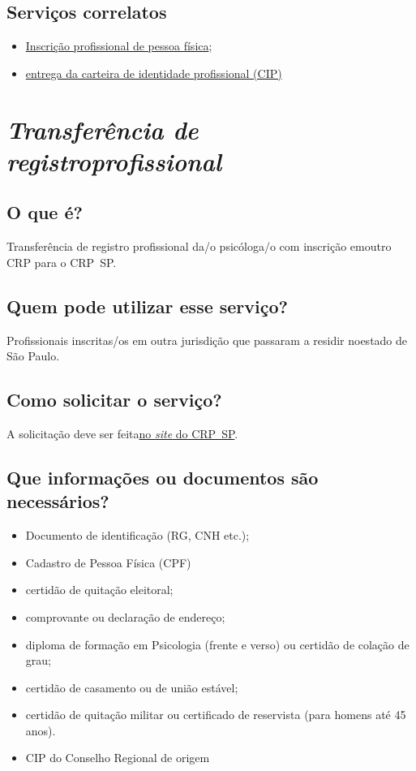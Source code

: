 \section{Serviços correlatos}

\begin{itemize}
  \item  \hyperref[]{Inscrição  profissional de pessoa física};
  \item  \hyperref[]{entrega  da carteira de identidade profissional (CIP)}
\end{itemize}

\chapter{\texorpdfstring{\emph{Transferência de registroprofissional}}{Transferência de registro profissional}}


\section{O que é?}

Transferência de registro profissional da/o psicóloga/o com inscrição emoutro CRP para o CRP~SP.

\section{Quem pode utilizar esse serviço?}

Profissionais inscritas/os em outra jurisdição que passaram a residir noestado de São Paulo.

\section{Como solicitar o serviço?}

A solicitação deve ser feita\href{https://www.crpsp.org/pagina/view/337}{no \emph{site} do CRP~SP}.

\section{Que informações ou documentos são necessários?}

\begin{itemize}
  \item  Documento de identificação (RG, CNH etc.);
  \item  Cadastro de Pessoa Física (CPF)
  \item  certidão de quitação eleitoral;
  \item  comprovante ou declaração de endereço;
  \item  diploma de formação em Psicologia (frente e verso) ou certidão de  colação de grau;
  \item  certidão de casamento ou de união estável;
  \item  certidão de quitação militar ou certificado de reservista (para homens  até 45 anos).
  \item  CIP do Conselho Regional de origem
\end{itemize}

